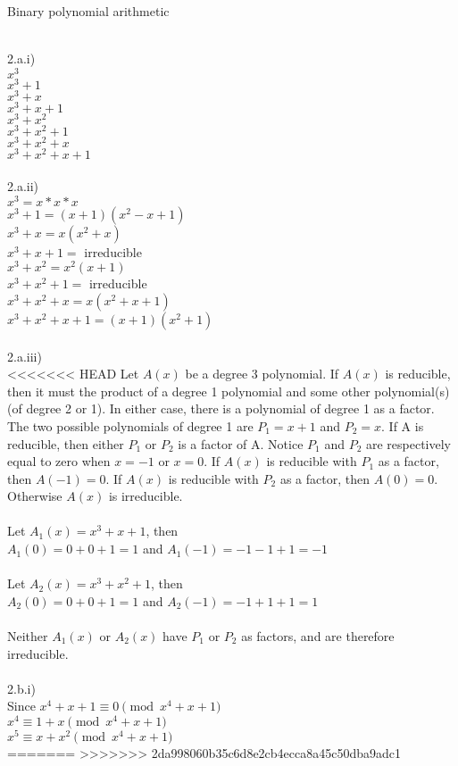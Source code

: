 \documentclass{assignment}
\newcommand\tab[1][0.5cm]{\hspace*{#1}}
\begin{document}
\begin{problemlist}
\pbitem Binary polynomial arithmetic
\begin{problem}
\begin{answer}
\\
2.a.i)\\
$x^3$\\
$x^3+1$\\
$x^3+x$\\
$x^3+x+1$\\
$x^3+x^2$\\
$x^3+x^2+1$\\
$x^3+x^2+x$\\
$x^3+x^2+x+1$\\
\\
2.a.ii)\\
$x^3=x*x*x$\\
$x^3+1=(x+1)(x^2-x+1)$\\
$x^3+x=x(x^2+x)$\\
$x^3+x+1=$ irreducible\\
$x^3+x^2=x^2(x+1)$\\
$x^3+x^2+1=$ irreducible\\
$x^3+x^2+x=x(x^2+x+1)$\\
$x^3+x^2+x+1=(x+1)(x^2+1)$\\
\\
2.a.iii)\\
<<<<<<< HEAD
Let $A(x)$ be a degree 3 polynomial.  If $A(x)$ is reducible, then it must the product of a degree 1 polynomial and some other polynomial(s) (of degree 2 or 1).  In either case, there is a polynomial of degree 1 as a factor.  The two possible polynomials of degree 1 are $P_1=x+1$ and $P_2=x$.  If A is reducible, then either $P_1$ or $P_2$ is a factor of A.  Notice $P_1$ and $P_2$ are respectively equal to zero when $x=-1$ or $x=0$.  If $A(x)$ is reducible with $P_1$ as a factor, then $A(-1)=0$.  If $A(x)$ is reducible with $P_2$ as a factor, then $A(0)=0$.  Otherwise $A(x)$ is irreducible.\\
\\
Let $A_1(x)=x^3+x+1$, then \\
\tab$A_1(0)=0+0+1=1$ and $A_1(-1)=-1-1+1=-1$\\
\\
Let $A_2(x)=x^3+x^2+1$, then \\
\tab$A_2(0)=0+0+1=1$ and $A_2(-1)=-1+1+1=1$\\
\\
Neither $A_1(x)$ or $A_2(x)$ have $P_1$ or $P_2$ as factors, and are therefore irreducible.\\
\\
2.b.i)\\
Since $x^4+x+1\equiv 0  \pmod{x^4+x+1}$\\
$x^4\equiv 1+x  \pmod{x^4+x+1}$\\
$x^5\equiv x+x^2  \pmod{x^4+x+1}$\\
=======
>>>>>>> 2da998060b35c6d8e2cb4ecca8a45c50dba9adc1


\end{answer}
\end{problem}
\end{problemlist}
\end{document}
